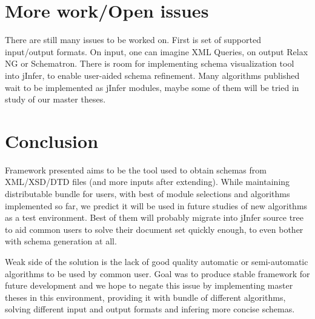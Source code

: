 \documentclass[a4paper,8pt,oneside,twocolumn]{article}
\begin{document}
\section*{More work/Open issues}
There are still many issues to be worked on.
First is set of supported input/output formats.
On input, one can imagine XML Queries, on output Relax NG or Schematron. 
There is room for implementing schema visualization tool into jInfer, to enable user-aided schema refinement.
Many algorithms published wait to be implemented as jInfer modules, maybe some of them will be tried in study of our master theses.

\section*{Conclusion}
Framework presented aims to be the tool used to obtain schemas from XML/XSD/DTD files (and more inputs after extending).
While maintaining distributable bundle for users, with best of module selections and algorithms implemented so far, we predict it will be used in future studies of new algorithms as a test environment.
Best of them will probably migrate into jInfer source tree to aid common users to solve their document set quickly enough, to even bother with schema generation at all.

Weak side of the solution is the lack of good quality automatic or semi-automatic algorithms to be used by common user.
Goal was to produce stable framework for future development and we hope to negate this issue by implementing master theses in this environment, providing it with bundle of different algorithms, solving different input and output formats and infering more concise schemas.

\nocite{*}
\newpage


\end{document}
